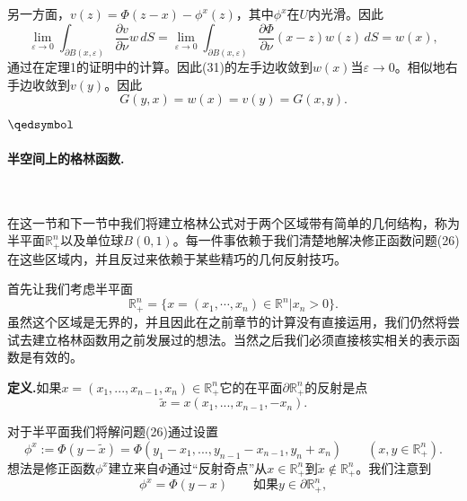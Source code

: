 \documentclass[leqno]{article}
\numberwithin{equation}{subsection}%
\begin{document}
另一方面，$v(z)=\Phi(z-x)-\phi^{x}(z)$，其中$\phi^{x}$在$U$内光滑。因此
\begin{equation*}
\lim_{\varepsilon\rightarrow 0}\int_{\partial B(x,\varepsilon)}\frac{\partial v}{\partial \nu}w\,dS=\lim_{\varepsilon\rightarrow 0}\int_{\partial B(x,\varepsilon)}\frac{\partial \Phi}{\partial \nu}(x-z)w(z)\,dS=w(x),
\end{equation*}
通过在定理1的证明中的计算。因此(31)的左手边收敛到$w(x)$当$\varepsilon\rightarrow 0$。相似地右手边收敛到$v(y)$。因此
\begin{equation*}
G(y,x)=w(x)=v(y)=G(x,y).
\end{equation*}
\par$\hfill\qedsymbol$



\paragraph{半空间上的格林函数.}~{}
\par
在这一节和下一节中我们将建立格林公式对于两个区域带有简单的几何结构，称为半平面$\mathbb{R}_{+}^{n}$以及单位球$B(0,1)$。每一件事依赖于我们清楚地解决修正函数问题(26)在这些区域内，并且反过来依赖于某些精巧的几何反射技巧。
\par
首先让我们考虑半平面
\begin{equation*}
\mathbb{R}_{+}^{n}=\{x=(x_{1},\cdots,x_{n})\in\mathbb{R}^{n}|x_{n}>0\}.
\end{equation*}
虽然这个区域是无界的，并且因此在之前章节的计算没有直接运用，我们仍然将尝试去建立格林函数用之前发展过的想法。当然之后我们必须直接核实相关的表示函数是有效的。
\par
\noindent\textbf{定义.}如果$x=(x_{1},...,x_{n-1},x_{n})\in\mathbb{R}_{+}^{n}$它的在平面$\partial\mathbb{R}_{+}^{n}$的反射是点
\begin{equation*}
\tilde{x}=x(x_{1},...,x_{n-1},-x_{n}).
\end{equation*}
\par
对于半平面我们将解问题(26)通过设置
\begin{equation*}
\phi^{x}:=\Phi(y-\tilde{x})=\Phi(y_{1}-x_{1},...,y_{n-1}-x_{n-1},y_{n}+x_{n})\qquad(x,y\in\mathbb{R}_{+}^{n}).
\end{equation*}
想法是修正函数$\phi^{x}$建立来自$\Phi$通过“反射奇点”从$x\in\mathbb{R}_{+}^{n}$到$\tilde{x}\not\in\mathbb{R}_{+}^{n}$。我们注意到
\begin{equation*}
\phi^{x}=\Phi(y-x)\qquad \text{如果}y\in\partial\mathbb{R}_{+}^{n},
\end{equation*}
\end{document}
